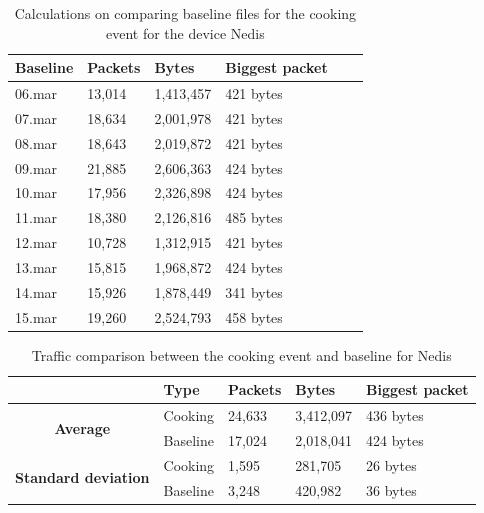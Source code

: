 \begin{table}[H]
    \centering
    \caption{Calculations on comparing baseline files for the cooking event for the device Nedis}
    \begin{tabular}{|l|l|l|l|l|l|}
    \hline
        \textbf{Baseline} & \textbf{Packets} & \textbf{Bytes} & \textbf{Biggest packet} \\ \hline
        06.mar & 13,014 & 1,413,457 & 421 bytes \\ \hline
        07.mar & 18,634 & 2,001,978 & 421 bytes \\ \hline
        08.mar & 18,643 & 2,019,872 & 421 bytes \\ \hline
        09.mar & 21,885 & 2,606,363 & 424 bytes \\ \hline
        10.mar & 17,956 & 2,326,898 & 424 bytes \\ \hline
        11.mar & 18,380 & 2,126,816 & 485 bytes \\ \hline
        12.mar & 10,728 & 1,312,915 & 421 bytes \\ \hline
        13.mar & 15,815 & 1,968,872 & 424 bytes \\ \hline
        14.mar & 15,926 & 1,878,449 & 341 bytes \\ \hline
        15.mar & 19,260 & 2,524,793 & 458 bytes \\ \hline
    \end{tabular}
    \label{tab:NedisBaselineCookingCalculations}
\end{table}

\begin{table}[H]
    \centering
    \caption{Traffic comparison between the cooking event and baseline for Nedis}
    \begin{tabular}{c|l|l|l|l|}
        \cline{2-5}
        \multicolumn{1}{l|}{}                                              & \textbf{Type} & \textbf{Packets} & \textbf{Bytes} & \textbf{Biggest packet} \\ \hline
        \multicolumn{1}{|c|}{\multirow{2}{*}{\textbf{Average}}}            & Cooking         & 24,633             & 3,412,097       & 436 bytes               \\ \cline{2-5} 
        \multicolumn{1}{|c|}{}                                             & Baseline      & 17,024             & 2,018,041       & 424 bytes                \\ \hline
        \multicolumn{1}{|c|}{\multirow{2}{*}{\textbf{Standard deviation}}} & Cooking         & 1,595              & 281,705         & 26 bytes                 \\ \cline{2-5} 
        \multicolumn{1}{|c|}{}                                             & Baseline      & 3,248              & 420,982         & 36 bytes               \\ \hline          
    \end{tabular}
    \label{tab:NedisComparingBaselineAndCookingCalculations}
\end{table}

